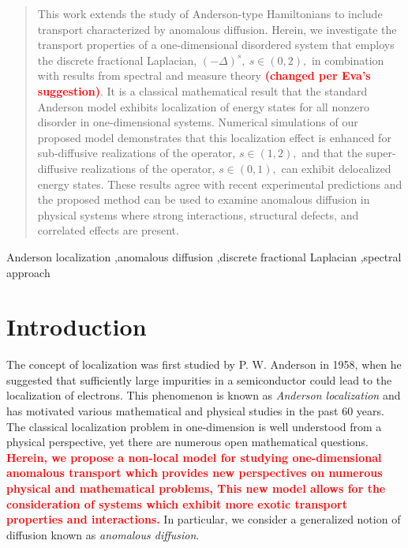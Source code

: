 \documentclass[final,1p,times]{elsarticle}
\theoremstyle{remark}
\theoremstyle{definition}
\newcommand{\josh}[1]{\textcolor{red}{\textbf{#1}}}
\begin{document}
\begin{frontmatter}
\begin{abstract}
This work extends the study of Anderson-type Hamiltonians to include transport characterized by anomalous diffusion. 
Herein, we investigate the transport properties of a one-dimensional disordered system that employs the discrete fractional Laplacian, $(-\Delta)^s,\ s\in(0,2),$ in combination with results from spectral and measure theory \josh{(changed per Eva's suggestion)}.
It is a classical mathematical result that the standard Anderson model exhibits localization of energy states for all nonzero disorder in one-dimensional systems. Numerical simulations of our proposed model demonstrates that this localization effect is enhanced for sub-diffusive realizations of the operator, $s\in (1,2),$ and that the super-diffusive realizations of the operator, $s\in (0,1),$ can exhibit delocalized energy states. These results agree with recent experimental predictions and the proposed method can be used to examine anomalous diffusion in physical systems where strong interactions, structural defects, and correlated effects are present. 
\end{abstract}

\begin{keyword} 
Anderson localization \sep anomalous diffusion \sep discrete fractional Laplacian \sep spectral approach
\end{keyword}

\end{frontmatter}



\section{Introduction} 


The concept of localization was first studied by P. W. Anderson in 1958, when he suggested that sufficiently large impurities in a semiconductor could lead to the localization of electrons. This phenomenon is known as {\em Anderson localization} and has motivated various mathematical and physical studies in the past 60 years. The classical localization problem in one-dimension is well understood from a physical perspective, yet there are numerous open mathematical questions. 
\josh{Herein, we propose a non-local model for studying one-dimensional anomalous transport which provides new perspectives on numerous physical and mathematical problems, This new model allows for the consideration of systems which exhibit more exotic transport properties and interactions.} In particular, we consider a generalized notion of diffusion known as {\em anomalous diffusion}.
\end{document}
